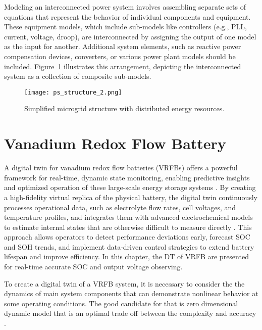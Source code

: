 Modeling an interconnected power system involves assembling separate sets of equations that represent the behavior of individual components and equipment. These equipment models, which include sub-models like controllers (e.g., PLL, current, voltage, droop), are interconnected by assigning the output of one model as the input for another. Additional system elements, such as reactive power compensation devices, converters, or various power plant models should be included. Figure~\cref{fig:ps_structure} illustrates this arrangement, depicting the interconnected system as a collection of composite sub-models.

\begin{figure}[htbp]
    \centering
    \texttt{[image: ps\_structure\_2.png]}
    \caption{Simplified microgrid structure with distributed energy resources.}
    \label{fig:ps_structure}
\end{figure}

\section{Vanadium Redox Flow Battery}\label{sec:ch3/sec1}

A digital twin for vanadium redox flow batteries (VRFBs) offers a powerful framework for real-time, dynamic state monitoring, enabling predictive insights and optimized operation of these large-scale energy storage systems \autocite{10615087}. By creating a high-fidelity virtual replica of the physical battery, the digital twin continuously processes operational data, such as electrolyte flow rates, cell voltages, and temperature profiles, and integrates them with advanced electrochemical models to estimate internal states that are otherwise difficult to measure directly \autocite{Pugach2020, bogdanov_dynamic_2023}. This approach allows operators to detect performance deviations early, forecast SOC and SOH trends, and implement data-driven control strategies to extend battery lifespan and improve efficiency. In this chapter, the DT of VRFB are presented for real-time accurate SOC and output voltage observing.  

To create a digital twin of a VRFB system, it is necessary to consider the the dynamics of main system components that can demonstrate nonlinear behavior at some operating conditions. The good candidate for that is zero dimensional dynamic model that is an  optimal trade off between the complexity and accuracy \autocite{pugach_zero_2018}.

